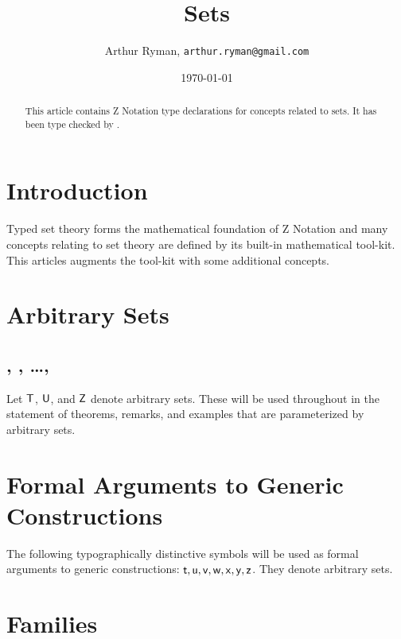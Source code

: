 \documentclass[11pt, oneside]{article}
\title{Sets}
\author{Arthur Ryman, {\tt arthur.ryman@gmail.com}}
\date{\today}
\begin{document}
\maketitle

\begin{abstract}
This article contains Z Notation type declarations for concepts related to sets.
It has been type checked by \fuzz.
\end{abstract}

\tableofcontents

\section{Introduction}

Typed set theory forms the mathematical foundation of Z Notation
and many concepts relating to set theory are defined by its built-in mathematical tool-kit. 
This articles augments the tool-kit with some additional concepts.

\section{Arbitrary Sets}

\subsection{, , \dots, }

Let $\mathsf{T}$, $\mathsf{U}$, and $\mathsf{Z}$ denote arbitrary sets.
These will be used throughout in the statement of theorems, remarks, and examples that are parameterized
by arbitrary sets.

\begin{zed}
	[\setT, \setU, \setV, \setW, \setX, \setY, \setZ]
\end{zed}

\section{Formal Arguments to Generic Constructions}

The following typographically distinctive symbols will be used as formal arguments to generic constructions:
$\mathsf{t}, \mathsf{u}, \mathsf{v}, \mathsf{w}, \mathsf{x}, \mathsf{y}, \mathsf{z}$. 
They denote arbitrary sets.

\section{Families}
\end{document}
